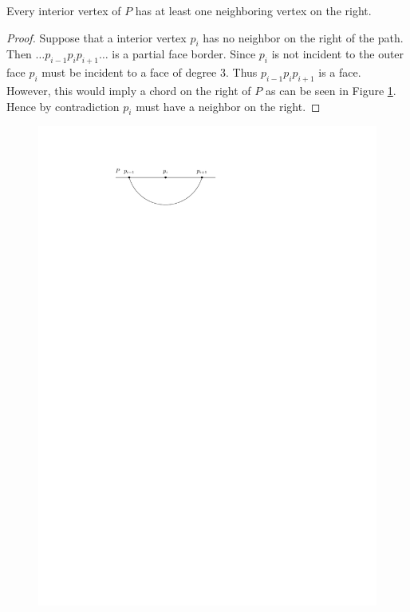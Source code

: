     \begin{lemma}
      \label{lm:right:pHasRightNeihgbours}
      Every interior vertex of $P$ has at least one neighboring vertex on the right.
    \end{lemma}

    \begin{proof}
      Suppose that a interior vertex $p_i$ has no neighbor on the right of the path. Then $ \ldots p_{i-1} p_i p_{i+1} \ldots $ is a partial face border. Since $p_i$ is not incident to the outer face $p_i$ must be incident to a face of degree $3$. Thus $p_{i-1} p_i p_{i+1}$ is a face. However, this would imply a chord on the right of $P$ as can be seen in Figure \ref{fig:right:pHasRightNeighbor}. Hence by contradiction $p_i$ must have a neighbor on the right.
    \end{proof}

    \begin{figure}[h]
      \centering
      \includegraphics[scale=1]{unifiedAlgo/img/rightNeighbourwalk/pHasRightNeighbor.pdf}
      \caption{}
      \label{fig:right:pHasRightNeighbor}
    \end{figure}


